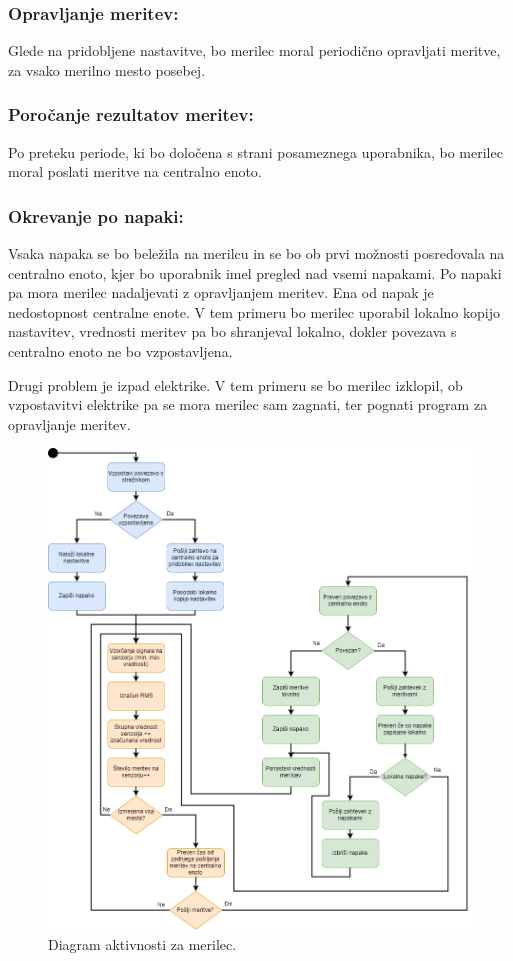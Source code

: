 \documentclass[12pt,a4paper,titlepage,openany]{report}
\begin{document}
\subsubsection{Opravljanje meritev:}
Glede na pridobljene nastavitve, bo merilec moral periodično opravljati meritve, za vsako merilno mesto posebej. 
\subsubsection{Poročanje rezultatov meritev:}
Po preteku periode, ki bo določena s strani posameznega uporabnika, bo merilec moral poslati meritve na centralno enoto. 
\subsubsection{Okrevanje po napaki:}
Vsaka napaka se bo beležila na merilcu  in se bo ob prvi možnosti posredovala na centralno enoto, kjer bo uporabnik imel pregled nad vsemi napakami. Po napaki pa mora merilec nadaljevati z opravljanjem meritev. Ena od napak je nedostopnost centralne enote. V tem primeru bo merilec uporabil lokalno kopijo nastavitev, vrednosti meritev pa bo shranjeval lokalno, dokler povezava s centralno enoto ne bo vzpostavljena. 

Drugi problem je izpad elektrike. V tem primeru se bo merilec izklopil, ob vzpostavitvi elektrike pa se mora merilec sam zagnati, ter pognati program za opravljanje meritev.


\begin{figure}[H]
\begin{center}
\includegraphics[width=1\linewidth]{Slike/ActivityMerilec.png}
\end{center}
\caption{Diagram aktivnosti za merilec.}\label{slika:ActivityMerilec}
\end{figure}
\end{document}
